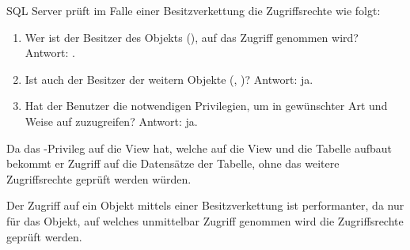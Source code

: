           SQL Server prüft im Falle einer Besitzverkettung die Zugriffsrechte
          wie folgt:
          \begin{enumerate}
            \item Wer ist der Besitzer des Objekts
            (), auf das Zugriff
            genommen wird? Antwort: .
            \item Ist  auch der Besitzer der weitern Objekte
            (, )?
            Antwort: ja.
            \item Hat der Benutzer  die notwendigen Privilegien,
            um in gewünschter Art und Weise auf
             zuzugreifen? Antwort: ja.
          \end{enumerate}
          Da  das -Privileg auf die View
           hat, welche auf die View
           und die Tabelle
           aufbaut bekommt er Zugriff auf die Datensätze
          der Tabelle, ohne das weitere Zugriffsrechte geprüft werden würden.
          \begin{merke}
            Der Zugriff auf ein Objekt mittels einer Besitzverkettung ist
            performanter, da nur für das Objekt, auf welches unmittelbar
            Zugriff genommen wird die Zugriffsrechte geprüft werden.
          \end{merke}
